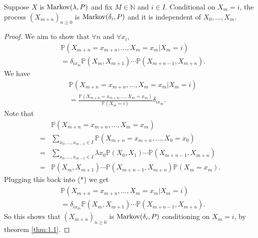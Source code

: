 \documentclass[a4paper]{article}
\begin{document}
\begin{theorem}\label{thm:simple_markov_property}
    Suppose $ X $ is $ \operatorname{Markov}(\lambda,P) $ and fix $ M\in \mathbb{N}  $ and $ i\in I $. Conditional on $X_m=i$, the process $ (X_{m+n})_{n\ge 0} $ is $ \operatorname{Markov}(\delta_i, P) $ and it is independent of $ X_0,\dots,X_m $.
\end{theorem}
\begin{proof}
    We aim to show that $ \forall n $ and $ \forall x_i $, 
    \[
        \begin{aligned}
            &\mathbb{P}(X_{m+n}=x_{m+n},\dots,X_m=x_m|X_m=i)\\
            &= \delta_{ix_m}\mathbb{P}(X_m,X_{m+1})\cdots \mathbb{P}(X_{m+n-1},X_{m+n}).
        \end{aligned}
    \]
    We have 
    \[
        \begin{aligned}
            &\mathbb{P}(X_{m+n}=x_{m+n},\dots,X_m=x_m|X_m=i)\\ &= \frac{\mathbb{P}(X_{m+n}=x_{m+n},\dots,X_{m}=x_m)}{\mathbb{P}(X_m=i)}\delta_{ix_m}.
        \end{aligned} \tag{$ * $}
    \]
    Note that
    \begin{align*}
        &\mathbb{P}(X_{m+n}=x_{m+n},\dots,X_m=x_m)\\
        =& \sum_{x_0,\dots,x_{m-1}\in I}\mathbb{P}(X_{m+n}=x_{m+n},\dots,X_0=x_0)\tag{Result in IA Probability}\\ 
        =& \sum_{x_0,\dots,x_{m-1}\in I} \lambda x_0 \mathbb{P}(X_0,X_1)\cdots  \mathbb{P}(X_{m+n-1},X_{m+n}) \tag{Since $ X \sim \Markov(\lambda,P) $}\\ 
        =& \mathbb{P}(X_m,X_{m+1})\cdots \mathbb{P}(X_{m+n-1},X_{m+n})\mathbb{P}(X_m=x_m).
    \end{align*}
    Plugging this back into ($ * $) we get 
    \[
        \begin{aligned}
            &\mathbb{P}(X_{m+n}=x_{m+n},\dots,X_m=x_m|X_m=i)\\ &= \delta_{ix_m}\mathbb{P}(X_m,X_{m+1})\cdots \mathbb{P}(X_{m+n-1},X_{m+n}).
        \end{aligned}
    \]
    So this shows that $ (X_{m+n})_{n\ge 0} $ is $ \operatorname{Markov}(\delta_i,P) $ conditioning on $X_m=i$, by theorem \ref{thm:1.1}.


\end{proof}
\end{document}
